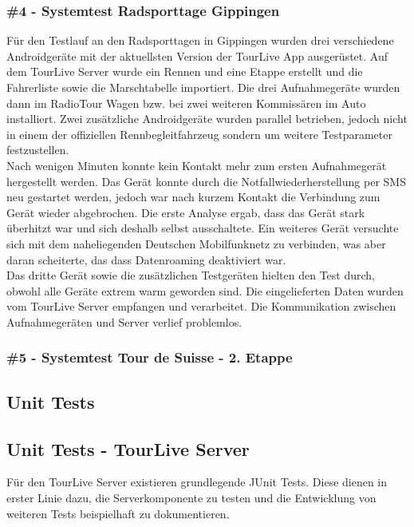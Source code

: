 \subsubsection{\#4 - Systemtest Radsporttage Gippingen}
\label{sec:testberichtgippingen}
Für den Testlauf an den Radsporttagen in Gippingen wurden drei verschiedene Androidgeräte mit der aktuellsten Version der TourLive App ausgerüstet. Auf dem TourLive Server wurde ein Rennen und eine Etappe erstellt und die Fahrerliste sowie die Marschtabelle importiert. Die drei Aufnahmegeräte wurden dann im RadioTour Wagen bzw. bei zwei weiteren Kommissären im Auto installiert. Zwei zusätzliche Androidgeräte wurden parallel betrieben, jedoch nicht in einem der offiziellen Rennbegleitfahrzeug sondern um weitere Testparameter festzustellen.
\\

Nach wenigen Minuten konnte kein Kontakt mehr zum ersten Aufnahmegerät hergestellt werden. Das Gerät konnte durch die Notfallwiederherstellung per SMS neu gestartet werden, jedoch war nach kurzem Kontakt die Verbindung zum Gerät wieder abgebrochen. Die erste Analyse ergab, dass das Gerät stark überhitzt war und sich deshalb selbst ausschaltete. Ein weiteres Gerät versuchte sich mit dem naheliegenden Deutschen Mobilfunknetz zu verbinden, was aber daran scheiterte, das dass Datenroaming deaktiviert war.
\\

Das dritte Gerät sowie die zusätzlichen Testgeräten hielten den Test durch, obwohl alle Geräte extrem warm geworden sind. Die eingelieferten Daten wurden vom TourLive Server empfangen und verarbeitet. Die Kommunikation zwischen Aufnahmegeräten und Server verlief problemlos.

\subsubsection{\#5 - Systemtest Tour de Suisse - 2. Etappe}


\subsection{Unit Tests}
\label{sec:unittests}
\subsection{Unit Tests - TourLive Server}
Für den TourLive Server existieren grundlegende JUnit Tests. Diese dienen in erster Linie dazu, die Serverkomponente zu testen und die Entwicklung von weiteren Tests beispielhaft zu dokumentieren.